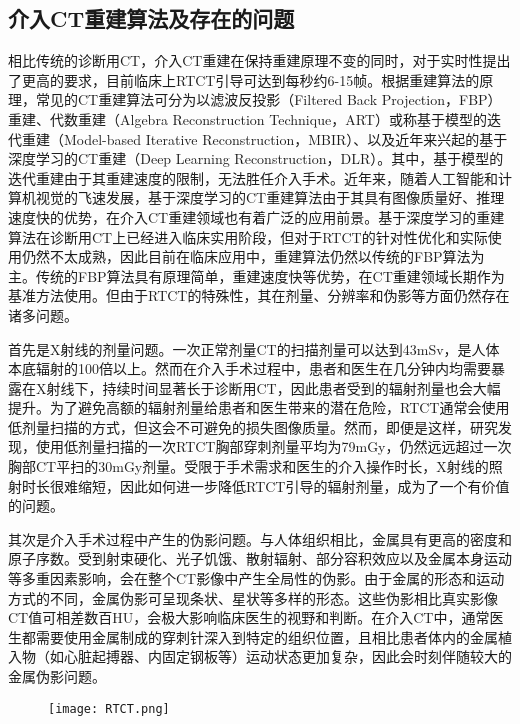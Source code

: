 \subsection{介入CT重建算法及存在的问题}
相比传统的诊断用CT，介入CT重建在保持重建原理不变的同时，对于实时性提出了更高的要求，目前临床上RTCT引导可达到每秒约6-15帧。根据重建算法的原理，常见的CT重建算法可分为以滤波反投影（Filtered Back Projection，FBP）重建、代数重建（Algebra Reconstruction Technique，ART）或称基于模型的迭代重建（Model-based Iterative Reconstruction，MBIR）、以及近年来兴起的基于深度学习的CT重建（Deep Learning Reconstruction，DLR）。其中，基于模型的迭代重建由于其重建速度的限制，无法胜任介入手术。近年来，随着人工智能和计算机视觉的飞速发展，基于深度学习的CT重建算法由于其具有图像质量好、推理速度快的优势，在介入CT重建领域也有着广泛的应用前景。基于深度学习的重建算法在诊断用CT上已经进入临床实用阶段，但对于RTCT的针对性优化和实际使用仍然不太成熟，因此目前在临床应用中，重建算法仍然以传统的FBP算法为主。传统的FBP算法具有原理简单，重建速度快等优势，在CT重建领域长期作为基准方法使用。但由于RTCT的特殊性，其在剂量、分辨率和伪影等方面仍然存在诸多问题。

首先是X射线的剂量问题。一次正常剂量CT的扫描剂量可以达到43mSv，是人体本底辐射的100倍以上\cite{smith-bindmanRadiationDoseAssociated2009}。然而在介入手术过程中，患者和医生在几分钟内均需要暴露在X射线下，持续时间显著长于诊断用CT，因此患者受到的辐射剂量也会大幅提升。为了避免高额的辐射剂量给患者和医生带来的潜在危险，RTCT通常会使用低剂量扫描的方式，但这会不可避免的损失图像质量。然而，即便是这样，研究发现，使用低剂量扫描的一次RTCT胸部穿刺剂量平均为79mGy，仍然远远超过一次胸部CT平扫的30mGy剂量\cite{HuXiaoKunZhangFuJunXiaoYueYongCTJieRuZhiLiaoXue2020}。受限于手术需求和医生的介入操作时长，X射线的照射时长很难缩短，因此如何进一步降低RTCT引导的辐射剂量，成为了一个有价值的问题。

其次是介入手术过程中产生的伪影问题。与人体组织相比，金属具有更高的密度和原子序数。受到射束硬化、光子饥饿、散射辐射、部分容积效应以及金属本身运动等多重因素影响，会在整个CT影像中产生全局性的伪影\cite{demanMetalStreakArtifacts1999}。由于金属的形态和运动方式的不同，金属伪影可呈现条状、星状等多样的形态\cite{hsiehComputedTomographyPrinciples2022}。这些伪影相比真实影像CT值可相差数百HU，会极大影响临床医生的视野和判断。在介入CT中，通常医生都需要使用金属制成的穿刺针深入到特定的组织位置，且相比患者体内的金属植入物（如心脏起搏器、内固定钢板等）运动状态更加复杂，因此会时刻伴随较大的金属伪影问题。

\begin{figure}[!htp]
  \centering
  \texttt{[image: RTCT.png]}
  \label{fig. RTCT}
\end{figure}

